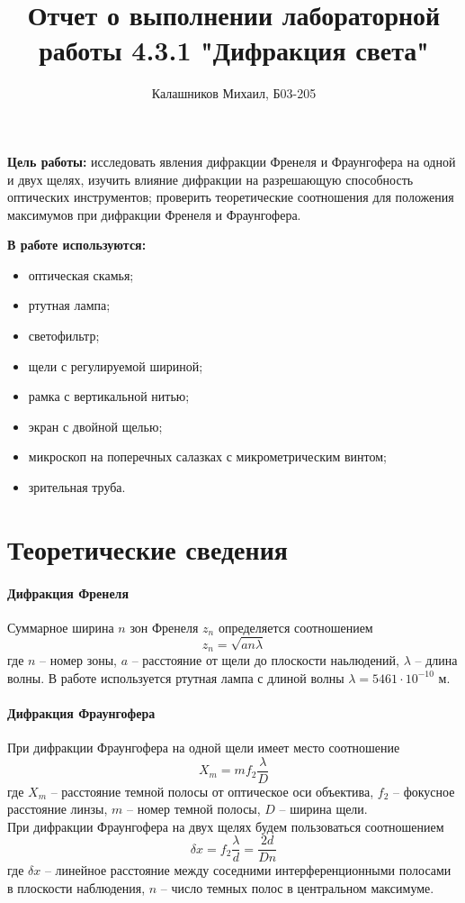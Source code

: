 \documentclass[14pt, a4paper]{report}
\title{\textbf{Отчет о выполнении лабораторной работы 4.3.1 "Дифракция света"}}
\author{Калашников Михаил, Б03-205}
\date{}
\begin{document}
\maketitle

\textbf{Цель работы:}
исследовать явления дифракции Френеля и Фраунгофера на одной и двух щелях, изучить влияние дифракции на разрешающую способность оптических инструментов; проверить теоретические соотношения для положения максимумов при дифракции Френеля и Фраунгофера.
\newline

\textbf{В работе используются:}
\begin{itemize}
\item оптическая скамья;
\item ртутная лампа;
\item светофильтр;
\item щели с регулируемой шириной;
\item рамка с вертикальной нитью;
\item экран с двойной щелью;
\item микроскоп на поперечных салазках с микрометрическим винтом;
\item зрительная труба.
\end{itemize}

\section{Теоретические сведения}

\paragraph{Дифракция Френеля}
Суммарное ширина $n$ зон Френеля $z_n$ определяется соотношением 
\begin{equation}
    z_n = \sqrt{an\lambda}
\end{equation}
где $n$ -- номер зоны, $a$ -- расстояние от щели до плоскости наьлюдений, $\lambda$ -- длина волны. В работе используется ртутная лампа с длиной волны $\lambda = 5461 \cdot 10^{-10}$ м.

\paragraph{Дифракция Фраунгофера}
При дифракции Фраунгофера на одной щели имеет место соотношение
\begin{equation}
    X_m = m f_2 \frac{\lambda}{D}
\end{equation}
где $X_m$ -- расстояние темной полосы от оптическое оси объектива, $f_2$ -- фокусное расстояние линзы, $m$ -- номер темной полосы, $D$ -- ширина щели. \\
При дифракции Фраунгофера на двух щелях будем пользоваться соотношением 
\begin{equation}
    \delta x = f_2 \frac{\lambda}{d} = \frac{2d}{Dn}
\end{equation}
где $\delta x$ -- линейное расстояние между соседними интерференционными полосами в плоскости наблюдения, $n$ -- число темных полос в центральном максимуме.
\end{document}
